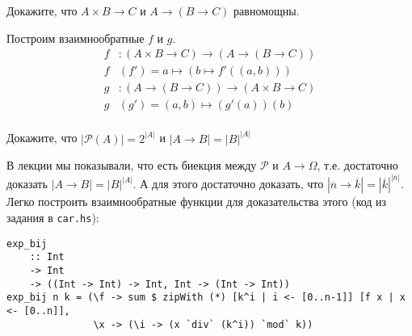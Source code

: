 \begin{task}[7]
Докажите, что $A \times B \rightarrow C$ и $A \rightarrow (B \rightarrow C)$ равномощны.
\end{task}
\begin{solution}
Построим взаимнообратные $f$ и $g$.
\begin{align*}
f &: (A \times B \rightarrow C) \rightarrow (A \rightarrow (B \rightarrow C)) \\
f&(f') = a \mapsto (b \mapsto f'((a, b))) \\
g &: (A \rightarrow (B \rightarrow C)) \rightarrow (A \times B \rightarrow C) \\
g&(g') = (a, b) \mapsto (g'(a))(b) \\
\end{align*}
\end{solution}

\begin{task}[8]
Докажите, что $|\mathcal{P}(A)| = 2^{|A|}$ и $|A \rightarrow B| = |B|^{|A|}$
\end{task}
\begin{solution}
В лекции мы показывали, что есть биекция между $\mathcal{P}$ и $A \rightarrow \Omega$, т.е. достаточно доказать $|A \rightarrow B| = |B|^{|A|}$. А для этого достаточно доказать, что
$|\overline{n} \rightarrow \overline{k}| = |\overline{k}|^|\overline{n}|$. Легко построить взаимнообратные функции для доказательства этого (код из задания в \texttt{car.hs}):
\begin{lstlisting}[]
exp_bij
    :: Int 
    -> Int
    -> ((Int -> Int) -> Int, Int -> (Int -> Int)) 
exp_bij n k = (\f -> sum $ zipWith (*) [k^i | i <- [0..n-1]] [f x | x <- [0..n]],
               \x -> (\i -> (x `div` (k^i)) `mod` k))
\end{lstlisting}
\end{solution}


